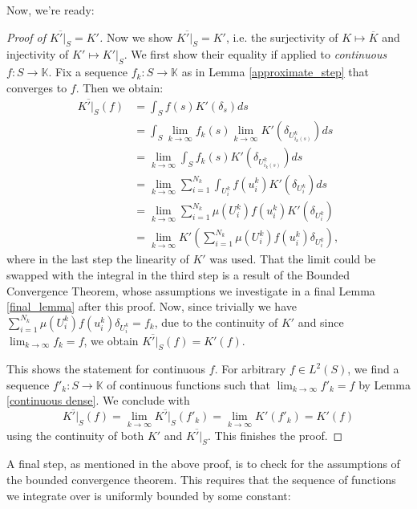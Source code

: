 \documentclass[12pt, a4paper]{article}
\theoremstyle{plain}
\theoremstyle{definition}
\theoremstyle{remark}
\newcommand{\K}{\mathds{K}}
\newcommand{\uu}{U_{i_k(s)}^k}
\begin{document}
Now, we're ready:

\begin{proof}[Proof of $\overline{K'|_S} = K'$]

Now we show $\overline{K'|_S} = K'$, i.e. the surjectivity of $K \mapsto \overline{K}$ and injectivity of $K' \mapsto K'|_S$. We first show their equality if applied to \emph{continuous} $f: S \to \K$. Fix a sequence $f_k: S \to \K$ as in Lemma \ref{approximate_step} that converges to $f$. Then we obtain:
\begin{align*}
\overline{K'|_S}(f) & = \int_{S} f(s) K'(\delta_s) ds \\
& = \int_S \lim_{k \to \infty}f_k(s) \lim_{k \to \infty} K'\left( \delta_{\uu}\right) ds \\
& = \lim_{k \to \infty} \int_S f_k(s) K'\left( \delta_{\uu}\right) ds \\
& = \lim_{k \to \infty} \sum_{i = 1}^{N_k} \int_{U_i^k}f\left(u_i^k\right) K'\left(\delta_{U_i^k} \right) ds \\
& = \lim_{k \to \infty} \sum_{i = 1}^{N_k} \mu\left(U_i^k \right) f\left( u_i^k\right)K'\left( \delta_{U_i^k}\right) \\
& = \lim_{k \to \infty} K'\left( \sum_{i = 1}^{N_k} \mu(U_i^k) f(u_i^k) \delta_{U_i^k} \right),
\end{align*}
where in the last step the linearity of $K'$ was used. That the limit could be swapped with the integral in the third step is a result of the Bounded Convergence Theorem, whose assumptions we investigate in a final Lemma \ref{final_lemma} after this proof.
Now, since trivially we have $\sum_{i = 1}^{N_k} \mu(U_i^k) f(u_i^k) \delta_{U_i^k} = f_k$,  due to the continuity of $K'$ and since $\lim_{k \to \infty} f_k = f$, we obtain $\overline{K'|_S}(f) = K'(f)$.

This shows the statement for continuous $f$. For arbitrary $f \in L^2(S)$, we find a sequence $f'_k: S \to \K$ of continuous functions such that $\lim_{k \to \infty} f'_k = f$ by Lemma \ref{continuous dense}. We conclude with
\begin{equation*}
\overline{K'|_S}(f) = \lim_{k \to \infty} \overline{K'|_S}(f'_k) = \lim_{k \to \infty} K'(f'_k) = K'(f)
\end{equation*}
using the continuity of both $K'$ and $\overline{K'|_S}$. This finishes the proof.
\end{proof}

A final step, as mentioned in the above proof, is to check for the assumptions of the bounded convergence theorem. This requires that the sequence of functions we integrate over is uniformly bounded by some constant:
\end{document}
